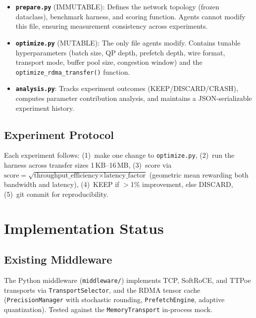 \documentclass[11pt,letterpaper]{article}
\theoremstyle{definition}
\begin{document}
\begin{itemize}
    \item \textbf{\texttt{prepare.py}} (IMMUTABLE): Defines the network topology (frozen dataclass), benchmark harness, and scoring function. Agents cannot modify this file, ensuring measurement consistency across experiments.

    \item \textbf{\texttt{optimize.py}} (MUTABLE): The only file agents modify. Contains tunable hyperparameters (batch size, QP depth, prefetch depth, wire format, transport mode, buffer pool size, congestion window) and the \texttt{optimize\_rdma\_transfer()} function.

    \item \textbf{\texttt{analysis.py}}: Tracks experiment outcomes (KEEP/DISCARD/CRASH), computes parameter contribution analysis, and maintains a JSON-serializable experiment history.
\end{itemize}

\subsection{Experiment Protocol}

Each experiment follows: (1)~make one change to \texttt{optimize.py}, (2)~run the harness across transfer sizes 1\,KB--16\,MB, (3)~score via $\text{score} = \sqrt{\text{throughput\_efficiency} \times \text{latency\_factor}}$ (geometric mean rewarding both bandwidth and latency), (4)~KEEP if $>$1\% improvement, else DISCARD, (5)~git commit for reproducibility.

\section{Implementation Status}
\label{sec:implementation-status}

\subsection{Existing Middleware}

The Python middleware (\texttt{middleware/}) implements TCP, SoftRoCE, and TTPoe transports via \texttt{TransportSelector}, and the RDMA tensor cache (\texttt{PrecisionManager} with stochastic rounding, \texttt{PrefetchEngine}, adaptive quantization). Tested against the \texttt{MemoryTransport} in-process mock.
\end{document}
